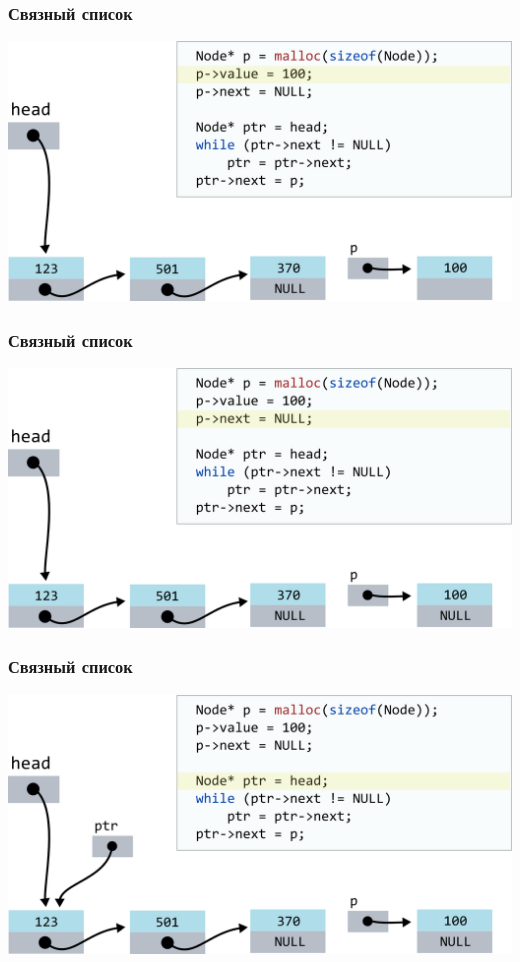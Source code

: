 \documentclass[10pt,pdf,hyperref={unicode}]{beamer}
\begin{document}
\begin{frame}[fragile]
\frametitle{Связный список}
\begin{center}
\includegraphics[width=\imageSizeMult\linewidth]{../images/codelist/codelistf_insert3.png}
\end{center}
\end{frame}



\begin{frame}[fragile]
\frametitle{Связный список}
\begin{center}
\includegraphics[width=\imageSizeMult\linewidth]{../images/codelist/codelistf_insert4.png}
\end{center}
\end{frame}



\begin{frame}[fragile]
\frametitle{Связный список}
\begin{center}
\includegraphics[width=\imageSizeMult\linewidth]{../images/codelist/codelistf_insert5.png}
\end{center}
\end{frame}
\end{document}
